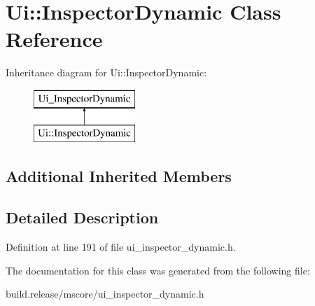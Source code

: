 \hypertarget{class_ui_1_1_inspector_dynamic}{}\section{Ui\+:\+:Inspector\+Dynamic Class Reference}
\label{class_ui_1_1_inspector_dynamic}
Inheritance diagram for Ui\+:\+:Inspector\+Dynamic\+:\begin{figure}[H]
\begin{center}
\leavevmode
\includegraphics[height=2.000000cm]{class_ui_1_1_inspector_dynamic}
\end{center}
\end{figure}
\subsection*{Additional Inherited Members}


\subsection{Detailed Description}


Definition at line 191 of file ui\+\_\+inspector\+\_\+dynamic.\+h.



The documentation for this class was generated from the following file\+:\begin{DoxyCompactItemize}
\item 
build.\+release/mscore/ui\+\_\+inspector\+\_\+dynamic.\+h\end{DoxyCompactItemize}
